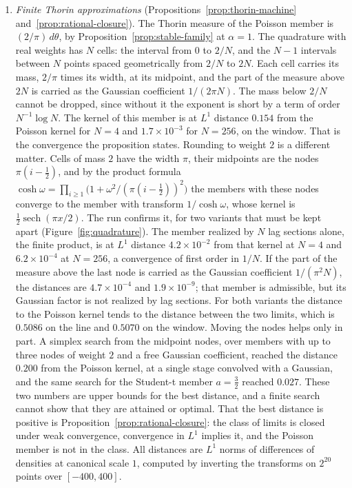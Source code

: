 \begin{example}
\begin{enumerate}
\item \emph{Finite Thorin approximations} (Propositions~\ref{prop:thorin-machine}
and~\ref{prop:rational-closure}). The
Thorin measure of the Poisson member is $(2/\pi)\,d\theta$, by
Proposition~\ref{prop:stable-family} at $\alpha = 1$. The quadrature with real weights has
$N$ cells: the interval from $0$ to $2/N$, and the $N - 1$ intervals between $N$ points spaced
geometrically from $2/N$ to $2N$. Each cell carries its mass, $2/\pi$ times its width, at its
midpoint, and the part of the measure above $2N$ is carried as the Gaussian coefficient
$1/(2\pi N)$. The mass below $2/N$ cannot be dropped, since without it the exponent is short by
a term of order $N^{-1}\log N$. The kernel of this member is at $L^1$ distance $0.154$ from
the Poisson kernel for $N = 4$ and $1.7 \times 10^{-3}$ for $N = 256$, on the window. That is the
convergence the proposition states. Rounding to weight $2$ is a different matter. Cells of
mass $2$ have the width $\pi$, their midpoints are the nodes $\pi(i - \tfrac12)$, and by the
product formula $\cosh\omega = \prod_{i \ge 1}\bigl(1 + \omega^2/(\pi(i-\tfrac12))^2\bigr)$
the members with these nodes converge to the member with transform $1/\cosh\omega$, whose
kernel is $\tfrac12\operatorname{sech}(\pi x/2)$. The run confirms it, for two variants that
must be kept apart (Figure~\ref{fig:quadrature}). The member realized by $N$ lag sections
alone, the finite product, is at $L^1$ distance $4.2 \times 10^{-2}$ from that kernel at
$N = 4$ and $6.2 \times 10^{-4}$ at $N = 256$, a convergence of first order in $1/N$. If the
part of the measure above the last node is carried as the Gaussian coefficient
$1/(\pi^2N)$, the distances are $4.7 \times 10^{-4}$ and $1.9 \times 10^{-9}$; that member
is admissible, but its Gaussian factor is not realized by lag sections. For both variants
the distance to the Poisson kernel tends to the distance between the two limits, which is
$0.5086$ on the line and $0.5070$ on the window.
Moving the nodes helps only in part. A simplex search from the midpoint nodes, over members
with up to three nodes of weight $2$ and a free Gaussian coefficient, reached the distance
$0.200$ from the Poisson kernel, at a single \Matern{} stage convolved with a Gaussian, and
the same search for the Student-t member $a = \tfrac32$ reached $0.027$. These two numbers
are upper bounds for the best distance, and a finite search cannot show that they are
attained or optimal. That the best distance is positive is
Proposition~\ref{prop:rational-closure}: the class of limits is closed under weak convergence,
convergence in $L^1$ implies it, and the Poisson member is not in the class. All distances
are $L^1$ norms of differences of densities at canonical scale $1$, computed by inverting
the transforms on $2^{20}$ points over $[-400, 400]$.
\end{enumerate}


\end{example}
